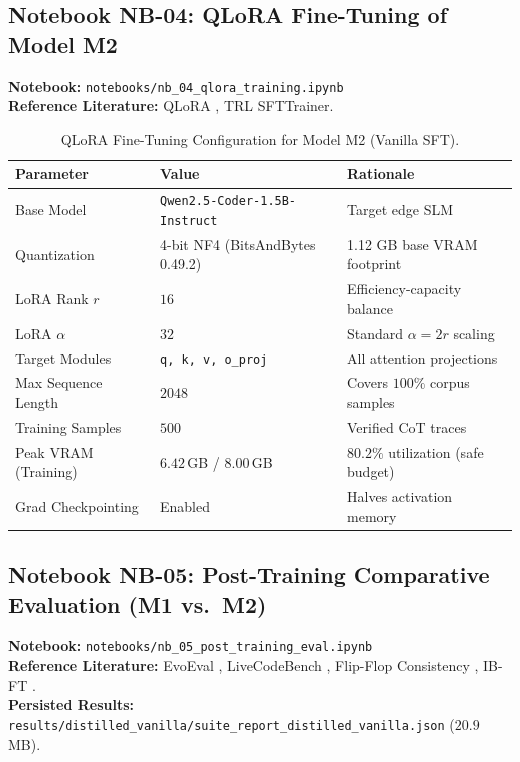 \documentclass[12pt, a4paper]{article}
\begin{document}
\subsection{Notebook NB-04: QLoRA Fine-Tuning of Model M2}
\textbf{Notebook:} \texttt{notebooks/nb\_04\_qlora\_training.ipynb}\\
\textbf{Reference Literature:} QLoRA \cite{peft_qlora}, TRL SFTTrainer.

\begin{table}[H]
\centering
\small
\caption{QLoRA Fine-Tuning Configuration for Model M2 (Vanilla SFT).}
\label{tab:qlora_config}
\begin{tabularx}{\textwidth}{l l X}
\toprule
\textbf{Parameter} & \textbf{Value} & \textbf{Rationale} \\
\midrule
Base Model           & \texttt{Qwen2.5-Coder-1.5B-Instruct} & Target edge SLM \cite{qwen25coder} \\
Quantization         & 4-bit NF4 (BitsAndBytes 0.49.2)      & 1.12 GB base VRAM footprint \\
LoRA Rank $r$        & $16$                                  & Efficiency-capacity balance \cite{peft_qlora} \\
LoRA $\alpha$        & $32$                                  & Standard $\alpha = 2r$ scaling \\
Target Modules       & \texttt{q, k, v, o\_proj}             & All attention projections \\
Max Sequence Length  & $2048$                                & Covers $100\%$ corpus samples \\
Training Samples     & $500$                                 & Verified CoT traces \\
Peak VRAM (Training) & $6.42$\,GB / $8.00$\,GB               & $80.2\%$ utilization (safe budget) \\
Grad Checkpointing   & Enabled                               & Halves activation memory \\
\bottomrule
\end{tabularx}
\end{table}

\subsection{Notebook NB-05: Post-Training Comparative Evaluation (M1 vs.\ M2)}
\textbf{Notebook:} \texttt{notebooks/nb\_05\_post\_training\_eval.ipynb}\\
\textbf{Reference Literature:} EvoEval \cite{evoeval}, LiveCodeBench \cite{livecodebench}, Flip-Flop Consistency \cite{flip_flop_consistency}, IB-FT \cite{ibft_memorization}.\\
\textbf{Persisted Results:} \texttt{results/distilled\_vanilla/suite\_report\_distilled\_vanilla.json} ($20.9$\,MB).
\end{document}
